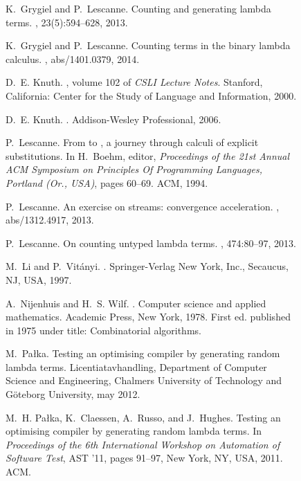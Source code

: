 \documentclass{sig-alternate}
\begin{document}
\begin{figure*}[!t]
\begin{thebibliography}{10}
K.~Grygiel and P.~Lescanne.
\newblock Counting and generating lambda terms.
, 23(5):594--628, 2013.

K.~Grygiel and P.~Lescanne.
\newblock Counting terms in the binary lambda calculus.
, abs/1401.0379, 2014.

D.~E. Knuth.
, volume 102 of {\em
  CSLI Lecture Notes}.
\newblock Stanford, California: Center for the Study of Language and
  Information, 2000.

D.~E. Knuth.
.
\newblock Addison-Wesley Professional, 2006.

P.~Lescanne.
\newblock From  to , a journey through calculi
  of explicit substitutions.
\newblock In H.~Boehm, editor, {\em Proceedings of the 21st Annual {ACM}
  Symposium on {P}rinciples {O}f {P}rogramming {L}anguages, {Portland (Or.,
  USA)}}, pages 60--69. ACM, 1994.

P.~Lescanne.
\newblock An exercise on streams: convergence acceleration.
, abs/1312.4917, 2013.

P.~Lescanne.
\newblock On counting untyped lambda terms.
, 474:80--97, 2013.

M.~Li and P.~Vit\'{a}nyi.
.
\newblock Springer-Verlag New York, Inc., Secaucus, NJ, USA, 1997.

A.~Nijenhuis and H.~S. Wilf.
.
\newblock Computer science and applied mathematics. Academic Press, New York,
  1978.
\newblock First ed. published in 1975 under title: Combinatorial algorithms.

M.~Pa{\l}ka.
\newblock Testing an optimising compiler by generating random lambda terms.
\newblock Licentiatavhandling, Department of Computer Science and Engineering,
  Chalmers University of Technology and G\"oteborg University, may 2012.

M.~H. Pa{\l}ka, K.~Claessen, A.~Russo, and J.~Hughes.
\newblock Testing an optimising compiler by generating random lambda terms.
\newblock In {\em Proceedings of the 6th International Workshop on Automation
  of Software Test}, AST '11, pages 91--97, New York, NY, USA, 2011. ACM.


\end{thebibliography}
\end{figure*}
\end{document}
